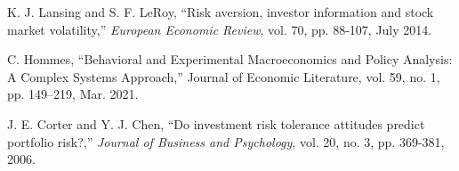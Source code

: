 \documentclass[letterpaper, 11 pt, proceedings]{IEEEtran}
\begin{document}
\begin{thebibliography}{99}
		K. J. Lansing and S. F. LeRoy, “Risk aversion, investor information and stock market volatility,” \textit{European Economic Review}, vol. 70, pp. 88-107, July 2014. 


		C. Hommes, “Behavioral and Experimental Macroeconomics and Policy Analysis: A Complex Systems Approach,” Journal of Economic Literature, vol. 59, no. 1, pp. 149–219, Mar. 2021.
		

		

		J. E. Corter and Y. J. Chen, “Do investment risk tolerance attitudes predict portfolio risk?,” \textit{Journal of Business and Psychology}, vol. 20, no. 3, pp. 369-381, 2006.
		


	\end{thebibliography}

		

\end{document}
